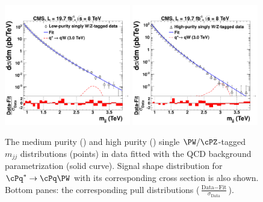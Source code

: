 \begin{figure}[th!b]
\begin{center}
\includegraphics[width=0.49\textwidth]{figs/MediumPuriqVFitAndPull.pdf}
\includegraphics[width=0.49\textwidth]{figs/HighPuriqVFitAndPull.pdf}
\end{center}
\caption{The medium purity (\cmsLeft) and high purity (\cmsRight) single $\PW/\cPZ$-tagged $m_{jj}$
  distributions (points) in data fitted with the QCD background parametrization (solid
  curve).  Signal shape distribution for $\cPq^* \to \cPq\PW$
   with its corresponding cross section is also shown.  Bottom panes:
  the corresponding pull distributions ($\frac{\text{Data}-\text{Fit}}{\sigma_{\text{Data}}}$).  }
\label{fig:singleVtagBG}
\end{figure}

